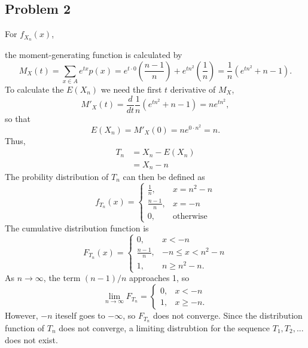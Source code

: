 \documentclass{article}
\begin{document}
\subsection*{Problem 2}
For $f_{X_n}(x)$, 
\iffalse
\[f_{X_n}(x) = \begin{dcases}
\frac{1}{n}, &x = n^2, \\
\frac{n-1}{n}, &x = 0, \\
0, &\textrm{otherwise}. 
\end{dcases}\]
\fi
the moment-generating function is calculated by \[M_X(t) = \sum_{x\in A}e^{tx}p(x) = e^{t\cdot 0}\left(\frac{n-1}{n}\right) + e^{tn^2}\left(\frac{1}{n}\right) = \frac{1}{n}\left(e^{tn^2} + n - 1\right).\] To calculate the $E(X_n)$ we need the first $t$ derivative of $M_X$, \[M'_X(t) = \frac{d}{dt}\frac{1}{n}\left(e^{tn^2} + n - 1\right) = ne^{tn^2},\] so that \[E(X_n) = M'_X(0) = ne^{0\cdot n^2} = n.\]
Thus,
\[\begin{aligned}
T_n &= X_n - E(X_n) \\
&= X_n - n
\end{aligned}\]
The probility distribution of $T_n$ can then be defined as 
\[f_{T_n}(x) = \begin{cases}
\frac{1}{n}, &x = n^2 - n \\
\frac{n-1}{n}, &x = -n \\
0, &\text{otherwise}
\end{cases}\]
The cumulative distribution function is 
\[F_{T_n}(x) = \begin{cases}
0, & x < -n \\
\frac{n-1}{n}, & -n \leq x < n^2 - n \\
1, &n \geq n^2 - n.
\end{cases}\]
As $n\to\infty$, the term $(n-1)/n$ approaches 1, so
\[\lim_{n\to\infty} F_{T_n} = \begin{cases}
0, &x < -n \\
1, &x \geq -n. \end{cases}\]
However, $-n$ iteself goes to $-\infty$, so $F_{T_n}$ does not converge. Since the distribution function of $T_n$ does not converge, a limiting distrubtion for the sequence $T_1, T_2, ...$ does not exist.

\iffalse
For $T_n = X_n - E(X_n)$, \[\lim_{n\to\infty} T_n = \lim_{n\to\infty} X_n - \lim_{n\to\infty} E(X_n).\] $E(X) = n$ therefore $E(X)$ approaches infinity. For $X_n$, the probability that $x=n^2$ is $1/n$ and approaches zero. The probability that $x=0$ approaches $1$. Then  \[\lim_{n\to\infty} T_n = \lim_{n\to\infty} X_n - \lim_{n\to\infty} E(X_n) = 0 - \infty = -\infty.\] Therefore, there is no limiting distribution for $f_X$. 
\fi
\end{document}
